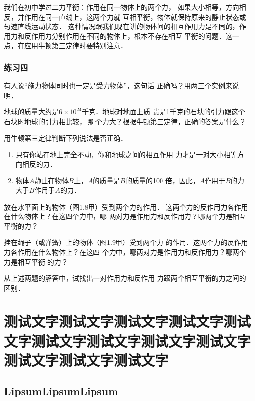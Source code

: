     我们在初中学过二力平衡：作用在同一物体上的两个力，
如果大小相等，方向相反，并作用在同一直线上，这两个力就
互相平衡，物体就保持原来的静止状态或匀速直线运动状态．
这种情况跟我们现在讲的物体间的相互作用力是不同的，作
用力和反作用力分别作用在不同的物体上，根本不存在相互
平衡的问题．这一点，在应用牛顿第三定律时要特别注意．


\subsection*{练习四}
\begin{QsNum}
\item  有人说“施力物体同时也一定是受力物体”，这句话
正确吗？用两三个实例来说明．

\item  地球的质量大约是$6\times 10^{24}$千克．地球对地面上质
贵是1千克的石块的引力跟这个石块时地球的引力相比较，哪
个力大？根据牛顿第三定律，正确的答案是什么？

\item  用牛顿第三定律判断下列说法是否正确．
\begin{enumerate}
\item  只有你站在地上完全不动，你和地球之间的相互作用
力才是一对大小相等方向相反的力．
\item  物体$A$静止在物体$B$上，$A$的质量是$B$的质量的100
倍，因此，$A$作用于$B$的力大于$B$作用于$A$的力．
\end{enumerate}

\item  放在水平面上的物体（图1.8甲）受到两个力的作用．
这两个力的反作用力各作用在什么物体上？在这四个力中，哪
两对力是作用力和反作用力？哪两个力是相互平衡的力？
\item  挂在绳子（或弹簧）上的物体（图1.9甲）受到两个力
的作用．这两个力的反作用力各作用在什么物体上？在这四
个力中，哪两对力是作用力和反作用力？哪两个力是相互平衡
的力？
\item 从上述两题的解答中，试找出一对作用力和反作用
力跟两个相互平衡的力之间的区别．

\end{QsNum}


\chapter*[测试文字]{测试文字测试文字测试文字测试文字测试文字测试文字测试文字测试文字测试文字测试文字测试文字测试文字}

\section*{LipsumLipsumLipsum}




